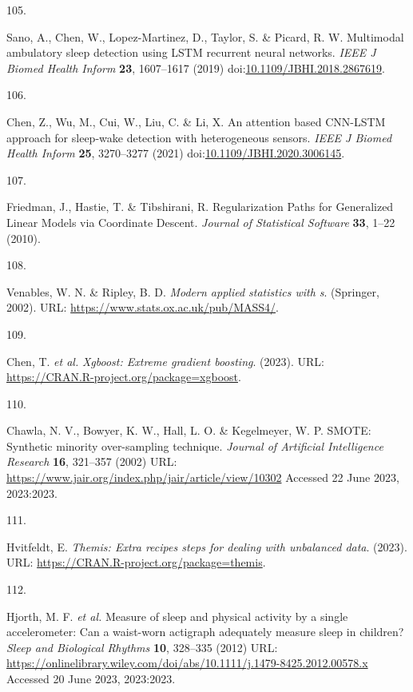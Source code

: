\documentclass[
  9pt,
]{scrbook}
\newlength{\cslhangindent}
\newlength{\csllabelwidth}
\newlength{\cslentryspacingunit} %
\newenvironment{CSLReferences}[2] %
 {%
  \setlength{\parindent}{0pt}
  \ifodd #1
  \let\oldpar\par
  \def\par{\hangindent=\cslhangindent\oldpar}
  \fi
  \setlength{\parskip}{#2\cslentryspacingunit}
 }%
 {}
\newcommand{\CSLLeftMargin}[1]{\parbox[t]{\csllabelwidth}{#1}}
\newcommand{\CSLRightInline}[1]{\parbox[t]{\linewidth - \csllabelwidth}{#1}\break}
\begin{document}
\begin{CSLReferences}{0}{0}
\leavevmode{}%
\CSLLeftMargin{105. }%
\CSLRightInline{Sano, A., Chen, W., Lopez-Martinez, D., Taylor, S. \&
Picard, R. W. Multimodal ambulatory sleep detection using {LSTM}
recurrent neural networks. \emph{{IEEE} J Biomed Health Inform}
\textbf{23}, 1607--1617 (2019)
doi:\href{https://doi.org/10.1109/JBHI.2018.2867619}{10.1109/JBHI.2018.2867619}.}

\leavevmode{}%
\CSLLeftMargin{106. }%
\CSLRightInline{Chen, Z., Wu, M., Cui, W., Liu, C. \& Li, X. An
attention based {CNN}-{LSTM} approach for sleep-wake detection with
heterogeneous sensors. \emph{{IEEE} J Biomed Health Inform} \textbf{25},
3270--3277 (2021)
doi:\href{https://doi.org/10.1109/JBHI.2020.3006145}{10.1109/JBHI.2020.3006145}.}

\leavevmode{}%
\CSLLeftMargin{107. }%
\CSLRightInline{Friedman, J., Hastie, T. \& Tibshirani, R.
Regularization Paths for Generalized Linear Models via Coordinate
Descent. \emph{Journal of Statistical Software} \textbf{33}, 1--22
(2010).}

\leavevmode{}%
\CSLLeftMargin{108. }%
\CSLRightInline{Venables, W. N. \& Ripley, B. D. \emph{Modern applied
statistics with s}. (Springer, 2002). URL:
\url{https://www.stats.ox.ac.uk/pub/MASS4/}.}

\leavevmode{}%
\CSLLeftMargin{109. }%
\CSLRightInline{Chen, T. \emph{et al.} \emph{Xgboost: Extreme gradient
boosting}. (2023). URL:
\url{https://CRAN.R-project.org/package=xgboost}.}

\leavevmode{}%
\CSLLeftMargin{110. }%
\CSLRightInline{Chawla, N. V., Bowyer, K. W., Hall, L. O. \& Kegelmeyer,
W. P. {SMOTE}: Synthetic minority over-sampling technique. \emph{Journal
of Artificial Intelligence Research} \textbf{16}, 321--357 (2002) URL:
\url{https://www.jair.org/index.php/jair/article/view/10302} Accessed 22
June 2023, 2023:2023.}

\leavevmode{}%
\CSLLeftMargin{111. }%
\CSLRightInline{Hvitfeldt, E. \emph{Themis: Extra recipes steps for
dealing with unbalanced data}. (2023). URL:
\url{https://CRAN.R-project.org/package=themis}.}

\leavevmode{}%
\CSLLeftMargin{112. }%
\CSLRightInline{Hjorth, M. F. \emph{et al.} Measure of sleep and
physical activity by a single accelerometer: Can a waist-worn actigraph
adequately measure sleep in children? \emph{Sleep and Biological
Rhythms} \textbf{10}, 328--335 (2012) URL:
\url{https://onlinelibrary.wiley.com/doi/abs/10.1111/j.1479-8425.2012.00578.x}
Accessed 20 June 2023, 2023:2023.}


\end{CSLReferences}
\end{document}

